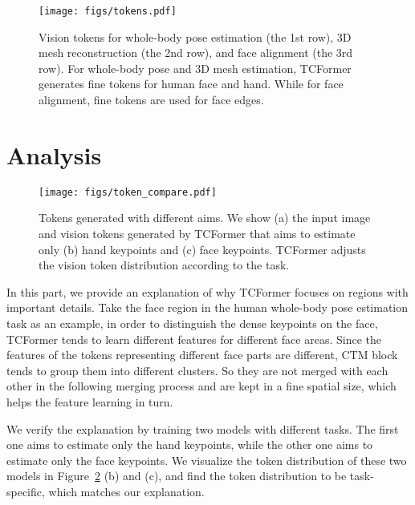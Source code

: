 \documentclass[10pt,twocolumn,letterpaper]{article}
\begin{document}
\begin{figure}[t]
	\centering
	\texttt{[image: figs/tokens.pdf]}
	\vspace{-5pt}
	\caption{
	Vision tokens for whole-body pose estimation (the 1st row), 3D mesh reconstruction (the 2nd row), and face alignment (the 3rd row). For whole-body pose and 3D mesh estimation, TCFormer generates fine tokens for human face and hand. While for face alignment, fine tokens are used for face edges.
	}
	\label{fig:tokes}
	\vspace{-5pt}
\end{figure}



\section{Analysis}

\begin{figure}[t]
	\centering
	\texttt{[image: figs/token\_compare.pdf]}
	\vspace{-5pt}
	\caption{
	Tokens generated with different aims. We show (a) the input image and vision tokens generated by TCFormer that aims to estimate only (b) hand keypoints and (c) face keypoints. TCFormer adjusts the vision token distribution according to the task.
	}
    \vspace{-3mm}
	\label{fig:token_compare}
\end{figure}


In this part, we provide an explanation of why TCFormer focuses on regions with important details. 
Take the face region in the human whole-body pose estimation task as an example, in order to distinguish the dense keypoints on the face, TCFormer tends to learn different features for different face areas.
Since the features of the tokens representing different face parts are different, CTM block tends to group them into different clusters. So they are not merged with each other in the following merging process and are kept in a fine spatial size, which helps the feature learning in turn.


We verify the explanation by training two models with different tasks.
The first one aims to estimate only the hand keypoints, while the other one aims to estimate only the face keypoints. 
We visualize the token  distribution of these two models 
in Figure~\ref{fig:token_compare} (b) and (c), and find the token distribution to be task-specific, which matches our explanation.
\end{document}

